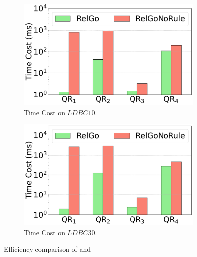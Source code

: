 \begin{figure}[t]
    \vspace{-1em}
    \centering
    \begin{subfigure}[b]{.45\linewidth}
        \centering
        \includegraphics[width=\linewidth]{./figures/exp/filter_sf10.pdf}
        \vspace{-1.5em}
        \caption{Time Cost on $LDBC10$.}
        \label{fig:exp-filter-sf10}
    \end{subfigure}
    \begin{subfigure}[b]{0.45\linewidth}
        \centering
        \includegraphics[width=\linewidth]{./figures/exp/filter_sf30.pdf}
        \vspace{-1.5em}
        \caption{Time Cost on $LDBC30$.}
        \label{fig:exp-filter-sf30}
    \end{subfigure}
    \caption{Efficiency comparison of \name and \relgonofi}
    \label{fig:exp-filter}
\end{figure}

